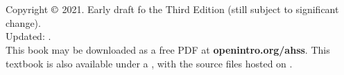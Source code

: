 \chapter*{}

\vfill


Copyright $\copyright$ 2021. Early draft fo the Third Edition (still subject to significant change). \\
Updated: \versiondate. \\

\noindent%
This book may be downloaded as a free PDF at
    {\color{black}\textbf{openintro.org/ahss}}.
This textbook is also available under a
,
with the source files hosted on
. \\


\printlocation



